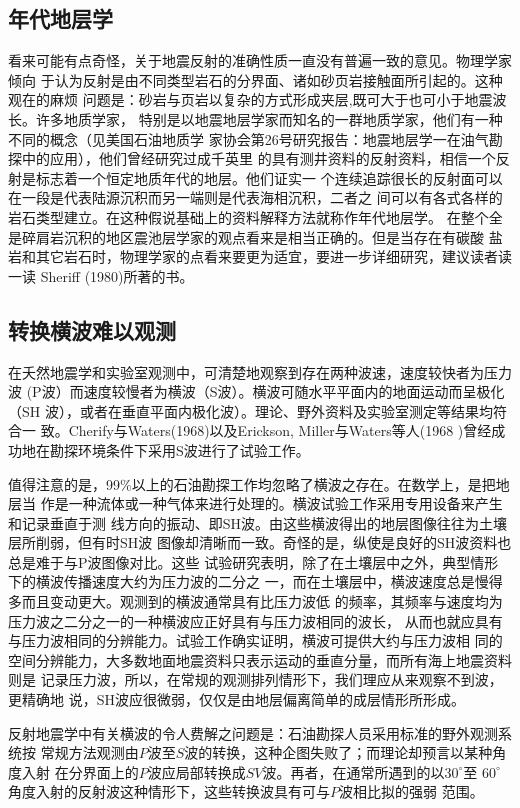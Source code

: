\subsection{年代地层学}
看来可能有点奇怪，关于地震反射的准确性质一直没有普遍一致的意见。物理学家倾向
于认为反射是由不同类型岩石的分界面、诸如砂页岩接触面所引起的。这种观在的麻烦
问题是：砂岩与页岩以复杂的方式形成夹层,既可大于也可小于地震波长。许多地质学家，
特别是以地震地层学家而知名的一群地质学家，他们有一种不同的概念（见美国石油地质学
家协会第26号研究报告：地震地层学一在油气勘探中的应用），他们曾经研究过成千英里
的具有测井资料的反射资料，相信一个反射是标志着一个恒定地质年代的地层。他们证实一
个连续追踪很长的反射面可以在一段是代表陆源沉积而另一端则是代表海相沉积，二者之
间可以有各式各样的岩石类型建立。在这种假说基础上的资料解释方法就称作年代地层学。
在整个全是碎肩岩沉积的地区震池层学家的观点看来是相当正确的。但是当存在有碳酸
盐岩和其它岩石时，物理学家的点看来要更为适宜，要进一步详细研究，建议读者读一读
Sheriff (1980)所著的书。

\subsection{转换横波难以观测}
在夭然地震学和实验室观测中，可清楚地观察到存在两种波速，速度较快者为压力波
(P波）而速度较慢者为横波（S波）。横波可随水平平面内的地面运动而呈极化（SH
波），或者在垂直平面内极化波）。理论、野外资料及实验室测定等结果均符合一
致。Cherify与Waters(1968)以及Erickson, Miller与Waters等人(1968
)曾经成功地在勘探环境条件下采用S波进行了试验工作。

值得注意的是，99\%以上的石油勘探工作均忽略了横波之存在。在数学上，是把地层当
作是一种流体或一种气体来进行处理的。横波试验工作采用专用设备来产生和记录垂直于测
线方向的振动、即SH波。由这些横波得出的地层图像往往为土壤层所削弱，但有时SH波
图像却清晰而一致。奇怪的是，纵使是良好的SH波资料也总是难于与P波图像对比。这些
试验研究表明，除了在土壤层中之外，典型情形下的横波传播速度大约为压力波的二分之
一，而在土壤层中，横波速度总是慢得多而且变动更大。观测到的横波通常具有比压力波低
的频率，其频率与速度均为压力波之二分之一的一种横波应正好具有与压力波相同的波长，
从而也就应具有与压力波相同的分辨能力。试验工作确实证明，横波可提供大约与压力波相
同的空间分辨能力，大多数地面地震资料只表示运动的垂直分量，而所有海上地震资料则是
记录压力波，所以，在常规的观测排列情形下，我们理应从来观察不到波，更精确地
说，SH波应很微弱，仅仅是由地层偏离简单的成层情形所形成。

反射地震学中有关横波的令人费解之问题是：石油勘探人员采用标准的野外观测系统按
常规方法观测由$P$波至$S$波的转换，这种企图失败了；而理论却预言以某种角度入射
在分界面上的$P$波应局部转换成$SV$波。再者，在通常所遇到的以$30^{\circ}$至
$60^{\circ}$角度入射的反射波这种情形下，这些转换波具有可与$P$波相比拟的强弱
范围。

